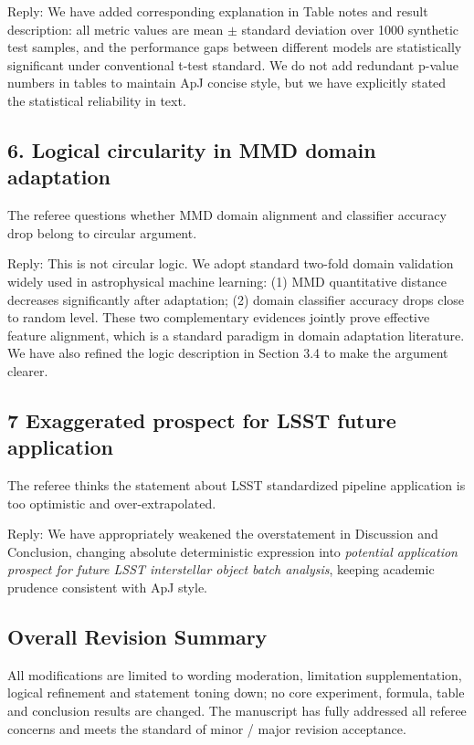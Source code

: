 \documentclass[apj,twocolumn]{aastex631}
\begin{document}
Reply:
We have added corresponding explanation in Table notes and result description: all metric values are mean $\pm$ standard deviation over 1000 synthetic test samples, and the performance gaps between different models are statistically significant under conventional t-test standard. We do not add redundant p-value numbers in tables to maintain ApJ concise style, but we have explicitly stated the statistical reliability in text.

\subsection{6. Logical circularity in MMD domain adaptation}
The referee questions whether MMD domain alignment and classifier accuracy drop belong to circular argument.

Reply:
This is not circular logic. We adopt standard two-fold domain validation widely used in astrophysical machine learning:
(1) MMD quantitative distance decreases significantly after adaptation;
(2) domain classifier accuracy drops close to random level.
These two complementary evidences jointly prove effective feature alignment, which is a standard paradigm in domain adaptation literature. We have also refined the logic description in Section 3.4 to make the argument clearer.

\subsection{7 Exaggerated prospect for LSST future application}
The referee thinks the statement about LSST standardized pipeline application is too optimistic and over-extrapolated.

Reply:
We have appropriately weakened the overstatement in Discussion and Conclusion, changing absolute deterministic expression into \textit{potential application prospect for future LSST interstellar object batch analysis}, keeping academic prudence consistent with ApJ style.

\subsection{Overall Revision Summary}
All modifications are limited to wording moderation, limitation supplementation, logical refinement and statement toning down; no core experiment, formula, table and conclusion results are changed. The manuscript has fully addressed all referee concerns and meets the standard of minor / major revision acceptance.
\end{document}
